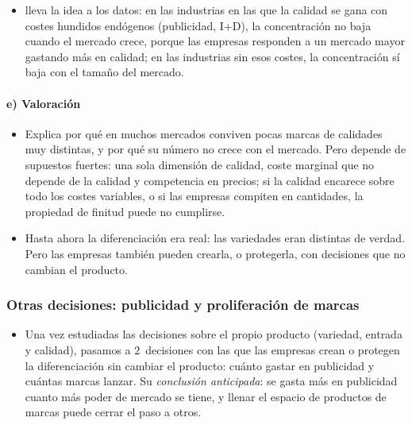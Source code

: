 \documentclass[11pt]{article}
\begin{document}
\begin{itemize}
\item \textcite{Sutton1991Sunk} lleva la idea a los datos: en las industrias en las que la calidad se gana con costes hundidos endógenos (publicidad, I+D), la concentración no baja cuando el mercado crece, porque las empresas responden a un mercado mayor gastando más en calidad; en las industrias sin esos costes, la concentración sí baja con el tamaño del mercado.
\end{itemize}

\paragraph{e) Valoración}

\begin{itemize}
\item Explica por qué en muchos mercados conviven pocas marcas de calidades muy distintas, y por qué su número no crece con el mercado. Pero depende de supuestos fuertes: una sola dimensión de calidad, coste marginal que no depende de la calidad y competencia en precios; si la calidad encarece sobre todo los costes variables, o si las empresas compiten en cantidades, la propiedad de finitud puede no cumplirse.
\item Hasta ahora la diferenciación era real: las variedades eran distintas de verdad. Pero las empresas también pueden crearla, o protegerla, con decisiones que no cambian el producto.
\end{itemize}

\subsubsection{Otras decisiones: publicidad y proliferación de marcas}\label{sec:publicidad-marcas}

\begin{itemize}
\item Una vez estudiadas las decisiones sobre el propio producto (variedad, entrada y calidad), pasamos a 2~decisiones con las que las empresas crean o protegen la diferenciación sin cambiar el producto: cuánto gastar en publicidad y cuántas marcas lanzar. Su \emph{conclusión anticipada}: se gasta más en publicidad cuanto más poder de mercado se tiene, y llenar el espacio de productos de marcas puede cerrar el paso a otros.
\end{itemize}
\end{document}
